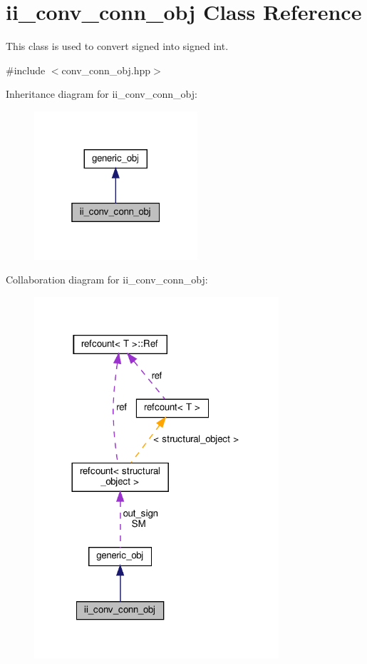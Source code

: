 \hypertarget{classii__conv__conn__obj}{}\section{ii\+\_\+conv\+\_\+conn\+\_\+obj Class Reference}
\label{classii__conv__conn__obj}


This class is used to convert signed into signed int.  




{\ttfamily \#include $<$conv\+\_\+conn\+\_\+obj.\+hpp$>$}



Inheritance diagram for ii\+\_\+conv\+\_\+conn\+\_\+obj\+:
\nopagebreak
\begin{figure}[H]
\begin{center}
\leavevmode
\includegraphics[width=172pt]{da/d8b/classii__conv__conn__obj__inherit__graph}
\end{center}
\end{figure}


Collaboration diagram for ii\+\_\+conv\+\_\+conn\+\_\+obj\+:
\nopagebreak
\begin{figure}[H]
\begin{center}
\leavevmode
\includegraphics[width=257pt]{de/d02/classii__conv__conn__obj__coll__graph}
\end{center}
\end{figure}
